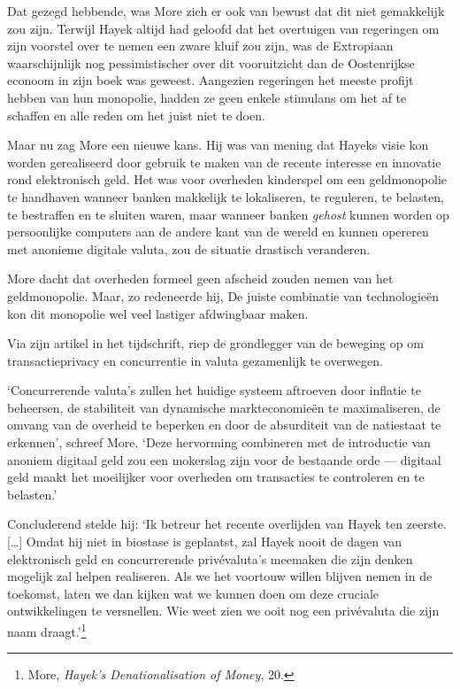 \documentclass[
  a5paper,
  smalldemyvopaper,11pt,twoside,onecolumn,openright,extrafontsizes,
hidelinks]{memoir}
\begin{document}
Dat gezegd hebbende, was More zich er ook van bewust dat dit niet
gemakkelijk zou zijn. Terwijl Hayek altijd had geloofd dat het
overtuigen van regeringen om zijn voorstel over te nemen een zware kluif
zou zijn, was de Extropiaan waarschijnlijk nog pessimistischer over dit
vooruitzicht dan de Oostenrijkse econoom in zijn boek was geweest.
Aangezien regeringen het meeste profijt hebben van hun monopolie, hadden
ze geen enkele stimulans om het af te schaffen en alle reden om het
juist niet te doen.

Maar nu zag More een nieuwe kans. Hij was van mening dat Hayeks visie
kon worden gerealiseerd door gebruik te maken van de recente interesse
en innovatie rond elektronisch geld. Het was voor overheden kinderspel
om een geldmonopolie te handhaven wanneer banken makkelijk te
lokaliseren, te reguleren, te belasten, te bestraffen en te sluiten
waren, maar wanneer banken \emph{gehost} kunnen worden op persoonlijke
computers aan de andere kant van de wereld en kunnen opereren met
anonieme digitale valuta, zou de situatie drastisch veranderen.

More dacht dat overheden formeel geen afscheid zouden nemen van het
geldmonopolie. Maar, zo redeneerde hij, De juiste combinatie van
technologieën kon dit monopolie wel veel lastiger afdwingbaar maken.

Via zijn artikel in het tijdschrift, riep de grondlegger van de beweging
op om transactieprivacy en concurrentie in valuta gezamenlijk te
overwegen.

`Concurrerende valuta's zullen het huidige systeem aftroeven door
inflatie te beheersen, de stabiliteit van dynamische markteconomieën te
maximaliseren, de omvang van de overheid te beperken en door de
absurditeit van de natiestaat te erkennen', schreef More. `Deze
hervorming combineren met de introductie van anoniem digitaal geld zou
een mokerslag zijn voor de bestaande orde --- digitaal geld maakt het
moeilijker voor overheden om transacties te controleren en te belasten.'

Concluderend stelde hij: `Ik betreur het recente overlijden van Hayek
ten zeerste. {[}\ldots{]} Omdat hij niet in biostase is geplaatst, zal
Hayek nooit de dagen van elektronisch geld en concurrerende
privévaluta's meemaken die zijn denken mogelijk zal helpen realiseren.
Als we het voortouw willen blijven nemen in de toekomst, laten we dan
kijken wat we kunnen doen om deze cruciale ontwikkelingen te versnellen.
Wie weet zien we ooit nog een privévaluta die zijn naam
draagt.'\footnote{More, \emph{Hayek's Denationalisation of Money}, 20.}
\end{document}
